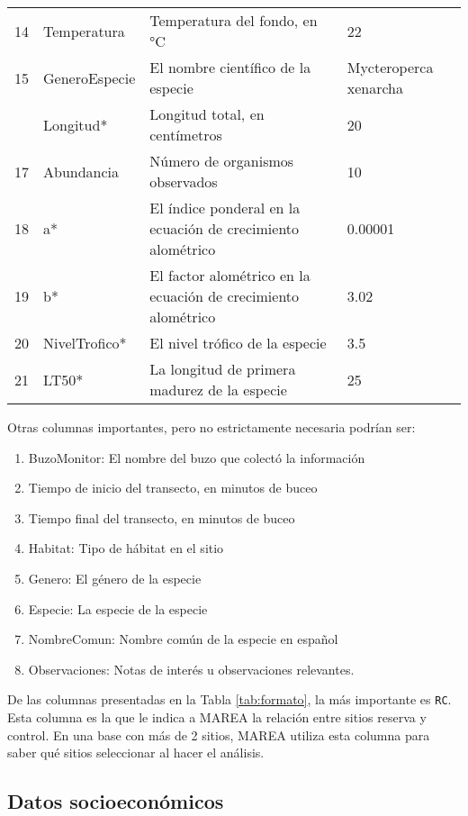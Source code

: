 \documentclass[]{krantz}
\providecommand{\tightlist}{%
  \setlength{\itemsep}{0pt}\setlength{\parskip}{0pt}}
\begin{document}
\begin{table}
\begin{tabular}[t]{rlll}
14 & Temperatura & Temperatura del fondo, en °C & 22\\
15 & GeneroEspecie & El nombre científico de la especie & Mycteroperca xenarcha\\
\addlinespace
16 & Longitud* & Longitud total, en centímetros & 20\\
17 & Abundancia & Número de organismos observados & 10\\
18 & a* & El índice ponderal en la ecuación de crecimiento alométrico & 0.00001\\
19 & b* & El factor alométrico en la ecuación de crecimiento alométrico & 3.02\\
20 & NivelTrofico* & El nivel trófico de la especie & 3.5\\
21 & LT50* & La longitud de primera madurez de la especie & 25\\
\bottomrule
\end{tabular}
\end{table}

Otras columnas importantes, pero no estrictamente necesaria podrían ser:

\begin{enumerate}
\def\labelenumi{\arabic{enumi}.}
\tightlist
\item
  BuzoMonitor: El nombre del buzo que colectó la información
\item
  Tiempo de inicio del transecto, en minutos de buceo
\item
  Tiempo final del transecto, en minutos de buceo
\item
  Habitat: Tipo de hábitat en el sitio
\item
  Genero: El género de la especie
\item
  Especie: La especie de la especie
\item
  NombreComun: Nombre común de la especie en español
\item
  Observaciones: Notas de interés u observaciones relevantes.
\end{enumerate}

De las columnas presentadas en la Tabla \ref{tab:formato}, la más
importante es \texttt{RC}. Esta columna es la que le indica a MAREA la
relación entre sitios reserva y control. En una base con más de 2
sitios, MAREA utiliza esta columna para saber qué sitios seleccionar al
hacer el análisis.

\hypertarget{datos-socioeconomicos}{%
\subsection{Datos socioeconómicos}\label{datos-socioeconomicos}}
\end{document}
